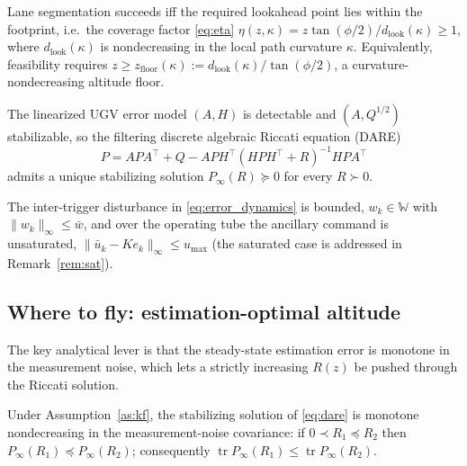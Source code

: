 \begin{assumption}\label{as:cov}
Lane segmentation succeeds iff the required lookahead point lies within the
footprint, i.e.\ the coverage factor \eqref{eq:eta}
$\eta(z,\kappa)=z\tan(\phi/2)/d_{\mathrm{look}}(\kappa)\ge 1$, where
$d_{\mathrm{look}}(\kappa)$ is nondecreasing in the local path curvature $\kappa$.
Equivalently, feasibility requires
$z\ge z_{\mathrm{floor}}(\kappa):=d_{\mathrm{look}}(\kappa)/\tan(\phi/2)$,
a curvature-nondecreasing altitude floor.
\end{assumption}

\begin{assumption}\label{as:kf}
The linearized UGV error model $(A,H)$ is detectable and $(A,Q^{1/2})$
stabilizable, so the filtering discrete algebraic Riccati equation (DARE)
\begin{equation}
P = A P A^{\!\top}\! + Q - A P H^{\!\top}(H P H^{\!\top}\!+R)^{-1} H P A^{\!\top}
\label{eq:dare}
\end{equation}
admits a unique stabilizing solution $P_\infty(R)\succeq 0$ for every $R\succ 0$.
\end{assumption}

\begin{assumption}\label{as:w}
The inter-trigger disturbance in \eqref{eq:error_dynamics} is bounded,
$w_k\in\mathbb{W}$ with $\|w_k\|_\infty\le \bar w$, and over the operating tube
the ancillary command is unsaturated, $\|\bar u_k - K e_k\|_\infty\le u_{\max}$
(the saturated case is addressed in Remark~\ref{rem:sat}).
\end{assumption}

\subsection{Where to fly: estimation-optimal altitude}

The key analytical lever is that the steady-state estimation error is monotone in
the measurement noise, which lets a strictly increasing $R(z)$ be pushed through
the Riccati solution.

\begin{lemma}\label{lem:mono}
Under Assumption~\ref{as:kf}, the stabilizing solution of \eqref{eq:dare} is
monotone nondecreasing in the measurement-noise covariance: if
$0\prec R_1\preceq R_2$ then $P_\infty(R_1)\preceq P_\infty(R_2)$; consequently
$\operatorname{tr}P_\infty(R_1)\le\operatorname{tr}P_\infty(R_2)$.
\end{lemma}

